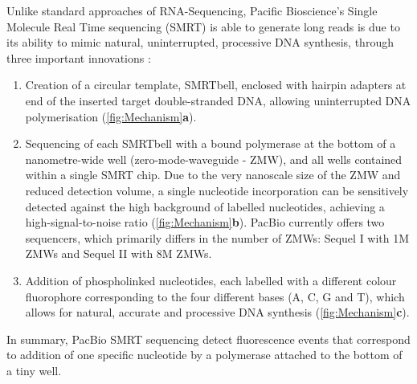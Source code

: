 Unlike standard approaches of RNA-Sequencing, Pacific Bioscience’s Single Molecule Real Time sequencing (SMRT) is able to generate long reads is due to its ability to mimic natural, uninterrupted, processive DNA synthesis, through three important innovations \cite{Eid2009}: 
\begin{enumerate}
	\item Creation of a circular template, SMRTbell, enclosed with hairpin adapters at end of the inserted target double-stranded DNA, allowing uninterrupted DNA polymerisation \cite{Travers2010} (\cref{fig:Mechanism}\textbf{a}).
	\item Sequencing of each SMRTbell with a bound polymerase at the bottom of a nanometre-wide well (zero-mode-waveguide - ZMW), and all wells contained within a single SMRT chip\cite{Levene2003}. Due to the very nanoscale size of the ZMW and reduced detection volume, a single nucleotide incorporation can be sensitively detected against the high background of labelled nucleotides, achieving a high-signal-to-noise ratio (\cref{fig:Mechanism}\textbf{b}). PacBio currently offers two sequencers, which primarily differs in the number of ZMWs: Sequel I with 1M ZMWs and Sequel II with 8M ZMWs.   
	\item Addition of phospholinked nucleotides, each labelled with a different colour fluorophore corresponding to the four different bases (A, C, G and T), which allows for natural, accurate and processive DNA synthesis\cite{Mccarthy2010} (\cref{fig:Mechanism}\textbf{c}).
\end{enumerate}
In summary, PacBio SMRT sequencing detect fluorescence events that correspond to addition of one specific nucleotide by a polymerase attached to the bottom of a tiny well. 


